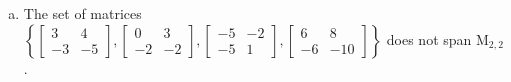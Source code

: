 \begin{exerciseAnswer}
\begin{enumerate}[(a)]
\item The set of matrices \( \left\{ \left[\begin{array}{cc}
3 & 4 \\
-3 & -5
\end{array}\right] , \left[\begin{array}{cc}
0 & 3 \\
-2 & -2
\end{array}\right] , \left[\begin{array}{cc}
-5 & -2 \\
-5 & 1
\end{array}\right] , \left[\begin{array}{cc}
6 & 8 \\
-6 & -10
\end{array}\right] \right\} \) does not span \(\mathrm{M}_{2,2}\). 
\end{enumerate}
    
\end{exerciseAnswer}
    
